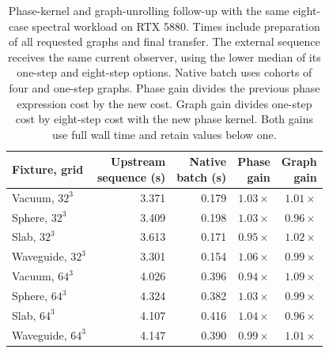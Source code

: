 \begin{table}[tbp]
\centering
\small
\renewcommand{\arraystretch}{1.15}
\caption{Phase-kernel and graph-unrolling follow-up with the same eight-case spectral workload on RTX 5880. Times include preparation of all requested graphs and final transfer. The external sequence receives the same current observer, using the lower median of its one-step and eight-step options. Native batch uses cohorts of four and one-step graphs. Phase gain divides the previous phase expression cost by the new cost. Graph gain divides one-step cost by eight-step cost with the new phase kernel. Both gains use full wall time and retain values below one.}
\label{tab:graph-ensembles}
\begin{tabular}{@{}lrrrr@{}}
\toprule
Fixture, grid & \shortstack{Upstream\\sequence (s)} & \shortstack{Native\\batch (s)} & \shortstack{Phase\\gain} & \shortstack{Graph\\gain} \\
\midrule
Vacuum, $32^3$ & 3.371 & 0.179 & $1.03\times$ & $1.01\times$ \\
Sphere, $32^3$ & 3.409 & 0.198 & $1.03\times$ & $0.96\times$ \\
Slab, $32^3$ & 3.613 & 0.171 & $0.95\times$ & $1.02\times$ \\
Waveguide, $32^3$ & 3.301 & 0.154 & $1.06\times$ & $0.99\times$ \\
Vacuum, $64^3$ & 4.026 & 0.396 & $0.94\times$ & $1.09\times$ \\
Sphere, $64^3$ & 4.324 & 0.382 & $1.03\times$ & $0.99\times$ \\
Slab, $64^3$ & 4.107 & 0.416 & $1.04\times$ & $0.96\times$ \\
Waveguide, $64^3$ & 4.147 & 0.390 & $0.99\times$ & $1.01\times$ \\
\bottomrule
\end{tabular}
\end{table}
